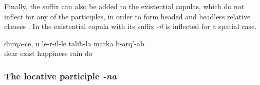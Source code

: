 Finally, the suffix  can also be added to the existential copulas, which do not inflect for any of the participles, in order to form headed and headless relative clauses . In  the existential copula with its suffix -\textit{il} is inflected for a spatial case.
%
\begin{exe}
	\ex	\label{ex:‎My dear, may on the place where you (fem.) are rain the rain of happiness}
	\gll	durqa-ce,	u	le-r-il-le	taliħ-la	marka	b-arq'-ab\\
		dear		exist	happiness	rain	do\\
	\glt	{}
\end{exe}


\subsubsection{The locative participle \textit{-na}}
\label{sssec:The locative participle}

